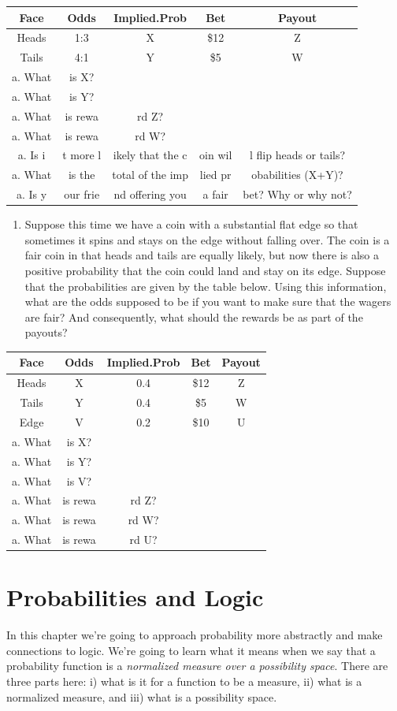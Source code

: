 \documentclass[]{tufte-book}
\providecommand{\tightlist}{%
  \setlength{\itemsep}{0pt}\setlength{\parskip}{0pt}}
\begin{document}
\begin{longtable}[]{@{}ccccc@{}}
\toprule
Face & Odds & Implied.Prob & Bet & Payout\tabularnewline
\midrule
\endhead
Heads & 1:3 & X & \$12 & Z\tabularnewline
Tails & 4:1 & Y & \$5 & W\tabularnewline
a. What & is X? & & &\tabularnewline
a. What & is Y? & & &\tabularnewline
a. What & is rewa & rd Z? & &\tabularnewline
a. What & is rewa & rd W? & &\tabularnewline
a. Is i & t more l & ikely that the c & oin wil & l flip heads or tails?\tabularnewline
a. What & is the & total of the imp & lied pr & obabilities (X+Y)?\tabularnewline
a. Is y & our frie & nd offering you & a fair & bet? Why or why not?\tabularnewline
\bottomrule
\end{longtable}

\begin{enumerate}
\def\labelenumi{\arabic{enumi}.}
\setcounter{enumi}{1}
\tightlist
\item
  Suppose this time we have a coin with a substantial flat edge so that sometimes it spins and stays on the edge without falling over. The coin is a fair coin in that heads and tails are equally likely, but now there is also a positive probability that the coin could land and stay on its edge. Suppose that the probabilities are given by the table below. Using this information, what are the odds supposed to be if you want to make sure that the wagers are fair? And consequently, what should the rewards be as part of the payouts?
\end{enumerate}

\begin{longtable}[]{@{}ccccc@{}}
\toprule
Face & Odds & Implied.Prob & Bet & Payout\tabularnewline
\midrule
\endhead
Heads & X & 0.4 & \$12 & Z\tabularnewline
Tails & Y & 0.4 & \$5 & W\tabularnewline
Edge & V & 0.2 & \$10 & U\tabularnewline
a. What & is X? & & &\tabularnewline
a. What & is Y? & & &\tabularnewline
a. What & is V? & & &\tabularnewline
a. What & is rewa & rd Z? & &\tabularnewline
a. What & is rewa & rd W? & &\tabularnewline
a. What & is rewa & rd U? & &\tabularnewline
\bottomrule
\end{longtable}

\hypertarget{probabilities-and-logic}{%
\chapter{Probabilities and Logic}\label{probabilities-and-logic}}

In this chapter we're going to approach probability more abstractly and make connections to logic. We're going to learn what it means when we say that a probability function is a \emph{normalized measure over a possibility space}. There are three parts here: i) what is it for a function to be a measure, ii) what is a normalized measure, and iii) what is a possibility space.
\end{document}
